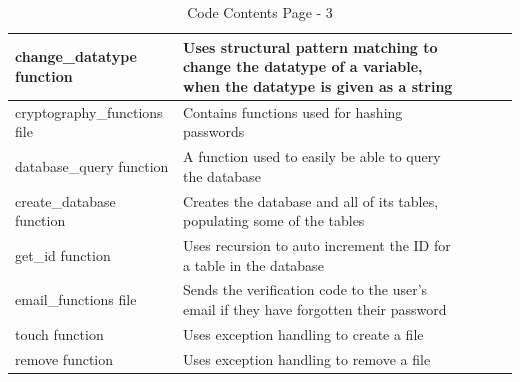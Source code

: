 \documentclass{article}
\begin{document}
\begin{table}[ht]
\begin{tabular}{ | p{0.33\linewidth} | p{0.57\linewidth} | p{0.1\linewidth} |}
    \hline
    change\_datatype function & Uses structural pattern matching to change the datatype of a variable, when the datatype is given as a string &\\
    \hline
    cryptography\_functions file & Contains functions used for hashing passwords &\\
    \hline
    database\_query function & A function used to easily be able to query the database &\\
    \hline
    create\_database function & Creates the database and all of its tables, populating some of the tables &\\
    \hline
    get\_id function & Uses recursion to auto increment the ID for a table in the database &\\
    \hline
    email\_functions file & Sends the verification code to the user's email if they have forgotten their password&\\
    \hline
    touch function & Uses exception handling to create a file &\\
    \hline
    remove function & Uses exception handling to remove a file &\\
    \hline
    \end{tabular}
    \caption{Code Contents Page - 3}
\end{table}
\clearpage
\end{document}
